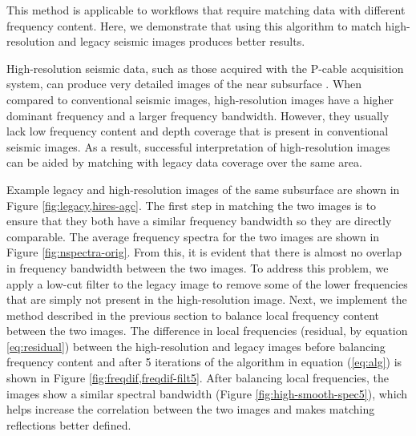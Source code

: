         This method is applicable to workflows that require matching data with different frequency content. 
        Here, we demonstrate that using this algorithm to match high-resolution and legacy seismic images produces better results.
        
        High-resolution seismic data, such as those acquired with the P-cable acquisition system, can produce very detailed images of the near subsurface \cite[]{tip}. 
        When compared to conventional seismic images, high-resolution images have a higher dominant frequency and a larger frequency bandwidth. 
        However, they usually lack low frequency content and depth coverage that is present in conventional seismic images. 
        As a result, successful interpretation of high-resolution images can be aided by matching with legacy data coverage over the same area.



        Example legacy and high-resolution images of the same subsurface are shown in Figure \ref{fig:legacy,hires-agc}. 
        The first step in matching the two images is to ensure that they both have a similar frequency bandwidth so they are directly comparable. 
        The average frequency spectra for the two images are shown in Figure \ref{fig:nspectra-orig}. 
        From this, it is evident that there is almost no overlap in frequency bandwidth between the two images.
        To address this problem, we apply a low-cut filter to the legacy image to remove some of the lower frequencies that are simply not present in the high-resolution image. 
        Next, we implement the method described in the previous section to balance local frequency content between the two images. 
        The difference in local frequencies (residual, by equation \ref{eq:residual}) between the high-resolution and legacy images before balancing frequency content and after 5 iterations of the algorithm in equation (\ref{eq:alg}) is shown in Figure \ref{fig:freqdif,freqdif-filt5}. 
        After balancing local frequencies, the images show a similar spectral bandwidth (Figure \ref{fig:high-smooth-spec5}), which helps increase the correlation between the two images and makes matching reflections better defined.
        
